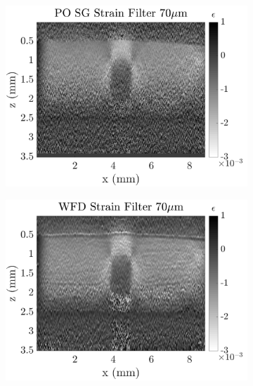 \begin{figure}[b!]
    \\
    \begin{subfigure}{0.49\textwidth}
    	\centering
        \includegraphics[width=\textwidth]{figures/posg_fr70_lr0.png}
	\end{subfigure}
    \begin{subfigure}{0.49\textwidth}
    	\centering
        \includegraphics[width=\textwidth]{figures/wfd_fr70_lr0.png}
    \end{subfigure}
    \\
    \begin{subfigure}{0.49\textwidth}
    	\centering

\end{subfigure}
\end{figure}

